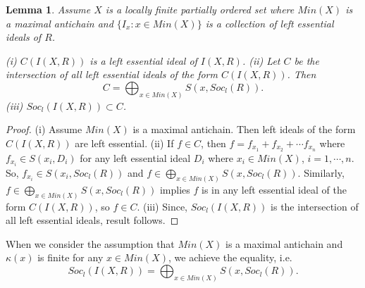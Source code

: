 \documentclass[12pt]{article}
\newtheorem{lemma}[theorem]{Lemma}
\begin{document}

\begin{lemma}
\label{C(I)} Assume $X$ is a locally finite partially ordered set where $%
Min(X)$ is a maximal antichain and $\{I_x : x \in Min(X)\}$ is a collection
of left essential ideals of $R$. %

\textrm{(i)} $C({I(X,R)})$ is a left essential ideal of ${I(X,R)}$. \newline
\textrm{(ii)} Let $C$ be the intersection of all left essential ideals of
the form $C({I(X,R)})$. Then 
\begin{equation*}
C = \bigoplus_{x \in Min(X)} S(x,Soc_l(R)).
\end{equation*}
\textrm{(iii)} $Soc_l({I(X,R)}) \subset C$. 
\end{lemma}
\begin{proof}
\textrm{(i)} Assume $Min(X)$ is a maximal antichain. Then left ideals of the
form $C({I(X,R)})$ are left essential. \newline
\textrm{(ii)} If $f \in C$, then $f = f_{x_1} + f_{x_2} + \cdots f_{x_n}$
where $f_{x_i} \in S(x_i, D_i)$ for any left essential ideal $D_i$ where $%
x_i \in Min(X)$, $i = 1, \cdots, n$. So, $f_{x_i} \in S(x_i, Soc_l(R))$ and $%
f \in \bigoplus_{x \in Min(X)} S(x,Soc_l(R))$. Similarly, $f \in
\bigoplus_{x \in Min(X)} S(x,Soc_l(R))$ implies $f$ is in any left essential
ideal of the form $C({I(X,R)})$, so $f \in C$. \newline
\textrm{(iii)} Since, $Soc_l({I(X,R)})$ is the intersection of all left
essential ideals, result follows. %
\end{proof}

When we consider the assumption that $Min(X)$ is a maximal antichain and 
$\kappa(x)$ is finite for any $x \in Min(X)$, we achieve the equality, 
i.e. $$Soc_l({I(X,R)}) = \bigoplus_{x \in Min(X)} S(x,Soc_l(R)).$$
\end{document}
